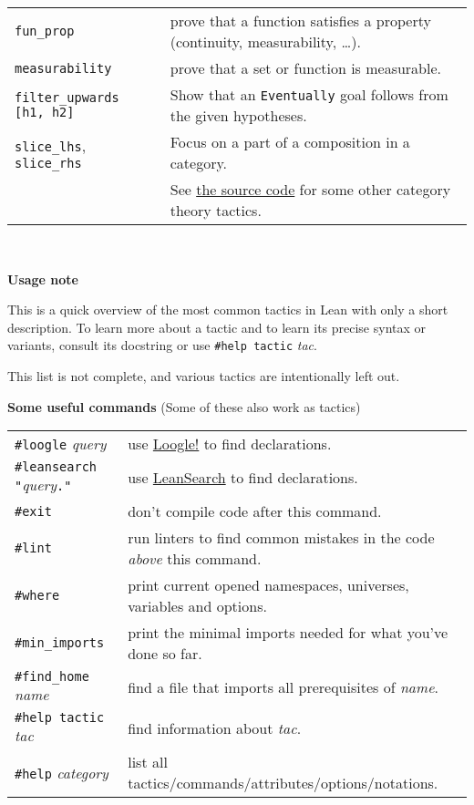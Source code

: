 \documentclass[a4paper]{article}
\newcommand{\lean}[1]{{\tt #1}}
\newcommand{\tactic}[1][]{\textit{tac#1}\xspace} %
\newcommand{\name}{\textit{name}\xspace}
\newcommand{\internet}{\faGlobe\xspace}
\begin{document}
\begin{center}
\begin{longtable}{@{}lp{113mm}@{}}
  \lean{fun\_prop} & prove that a function satisfies a property (continuity, measurability, \ldots). \\
  \lean{measurability} & prove that a set or function is measurable. \\
  \lean{filter\_upwards [h1, h2]} & Show that an \lean{Eventually} goal follows from the given hypotheses. \\
  \lean{slice\_lhs}, \lean{slice\_rhs} & Focus on a part of a composition in a category.\\
    & See \href{https://github.com/leanprover-community/mathlib4/tree/master/Mathlib/Tactic/CategoryTheory}{the source code} for some other category theory tactics. \\
  \bottomrule
\end{longtable}
\mbox{}\\
\end{center}

\textbf{Usage note}

This is a quick overview of the most common tactics in Lean with only a short description. To learn more about a tactic and to learn its precise syntax or variants, consult its docstring or use \lean{\#help tactic} \tactic.

This list is not complete, and various tactics are intentionally left out.
\bigskip

\textbf{Some useful commands} (Some of these also work as tactics)

\begin{longtable}{@{}lp{113mm}@{}}
\lean{\#loogle} \textit{query} & \internet use \href{https://loogle.lean-lang.org/}{Loogle!} to find declarations. \\
\lean{\#leansearch "}\textit{query}\lean{."} & \internet use \href{https://leansearch.net}{LeanSearch} to find declarations. \\
\lean{\#exit} & don't compile code after this command.\\
\lean{\#lint} & run linters to find common mistakes in the code \emph{above} this command.\\
\lean{\#where} & print current opened namespaces, universes, variables and options.\\
\lean{\#min\_imports} & print the minimal imports needed for what you've done so far.\\
\lean{\#find\_home} \name & find a file that imports all prerequisites of \name.\\
\lean{\#help tactic} \tactic & find information about \tactic.\\
\lean{\#help} \textit{category} & list all tactics/commands/attributes/options/notations.\\
\end{longtable}
\end{document}
